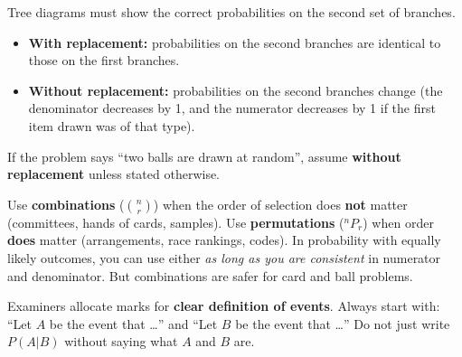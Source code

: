 \documentclass[11pt]{article}
\newcounter{popsec}
\newcounter{popsub}
\newcommand{\courssub}[1]{%
  \stepcounter{popsub}%
  \par\vspace{9pt}\noindent{\popxbold\fontsize{11.5}{13}\selectfont\color{popink}{\color{poporange}\thepopsec.\thepopsub}\hspace{6pt}#1}\par\nopagebreak\vspace{4pt}
}
\begin{document}
\begin{attention}
Tree diagrams must show the correct probabilities on the second set of branches.
\begin{itemize}
    \item \textbf{With replacement:} probabilities on the second branches are identical to those on the first branches.
    \item \textbf{Without replacement:} probabilities on the second branches change (the denominator decreases by 1, and the numerator decreases by 1 if the first item drawn was of that type).
\end{itemize}
If the problem says ``two balls are drawn at random'', assume \textbf{without replacement} unless stated otherwise.
\end{attention}

\begin{attention}
Use \textbf{combinations} ($\binom{n}{r}$) when the order of selection does \textbf{not} matter (committees, hands of cards, samples).
Use \textbf{permutations} (${}^nP_r$) when order \textbf{does} matter (arrangements, race rankings, codes).
In probability with equally likely outcomes, you can use either \emph{as long as you are consistent} in numerator and denominator. But combinations are safer for card and ball problems.
\end{attention}

\begin{attention}
Examiners allocate marks for \textbf{clear definition of events}. Always start with:
``Let $A$ be the event that \dots'' and ``Let $B$ be the event that \dots''
Do not just write $P(A|B)$ without saying what $A$ and $B$ are.
\end{attention}

\courssub{Exam Tips Checklist}
\end{document}
